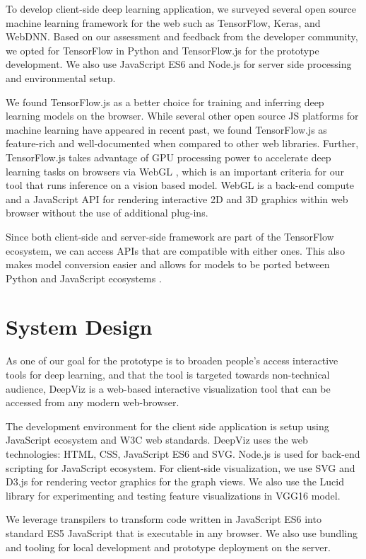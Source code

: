 To develop client-side deep learning application, we surveyed several open source machine learning framework for the web such as TensorFlow, Keras, and WebDNN. Based on our assessment and feedback from the developer community, we opted for TensorFlow in Python and TensorFlow.js for the prototype development. We also use JavaScript ES6 and Node.js for server side processing and environmental setup.

We found TensorFlow.js as a better choice for training and inferring deep learning models on the browser. While several other open source JS platforms for machine learning have appeared in recent past, we found TensorFlow.js as feature-rich and well-documented when compared to other web libraries. Further, TensorFlow.js takes advantage of GPU processing power to accelerate deep learning tasks on browsers via WebGL \cite{Ma2019}, which is an important criteria for our tool that runs inference on a vision based model. WebGL is a back-end compute and a JavaScript API for rendering interactive 2D and 3D graphics within web browser without the use of additional plug-ins.

Since both client-side and server-side framework are part of the TensorFlow ecosystem, we can access APIs that are compatible with either ones. This also makes model conversion easier and allows for models to be ported between Python and JavaScript ecosystems \cite{Smilkov2019}.

\section{System Design}

As one of our goal for the prototype is to broaden people's access interactive tools for deep learning, and that the tool is targeted towards non-technical audience, DeepViz is a web-based interactive visualization tool that can be accessed from any modern web-browser. 

The development environment for the client side application is setup using JavaScript ecosystem and W3C web standards. DeepViz uses the web technologies: HTML, CSS, JavaScript ES6 and SVG. Node.js is used for back-end scripting for JavaScript ecosystem. For client-side visualization, we use SVG and D3.js for rendering vector graphics for the graph views. We also use the Lucid library for experimenting and testing feature visualizations in VGG16 model.

We leverage transpilers to transform code written in JavaScript ES6 into standard ES5 JavaScript that is executable in any browser. We also use bundling and tooling for local development and prototype deployment on the server.

